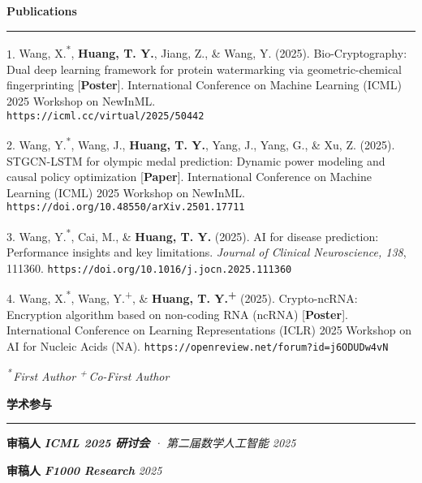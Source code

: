 \documentclass[UTF8, 10pt, fontset=adobe]{ctexart}
\renewenvironment{rSection}[1]{
\sectionskip
\textcolor{TsinghuaPurple}{\textbf{#1}}
\sectionlineskip
\hrule
\begin{list}{}{
\setlength{\leftmargin}{0em}
}
\item[]
}{
\end{list}
}
\begin{document}
\begin{rSection}{Publications}        

1. {Wang, X.\textsuperscript{*}, \textbf{Huang, T. Y.}, Jiang, Z., \& Wang, Y. (2025). Bio-Cryptography: Dual deep learning framework for protein watermarking via geometric-chemical fingerprinting [\textbf{Poster}]. International Conference on Machine Learning (ICML) 2025 Workshop on NewInML. \\\texttt{https://icml.cc/virtual/2025/50442}} 

2. {Wang, Y.\textsuperscript{*}, Wang, J., \textbf{Huang, T. Y.}, Yang, J., Yang, G., \& Xu, Z. (2025). STGCN-LSTM for olympic medal prediction: Dynamic power modeling and causal policy optimization [\textbf{Paper}]. International Conference on Machine Learning (ICML) 2025 Workshop on NewInML. \\
\texttt{https://doi.org/10.48550/arXiv.2501.17711}} 

3. {Wang, Y.\textsuperscript{*}, Cai, M., \& \textbf{Huang, T. Y.} (2025). AI for disease prediction: Performance insights and key limitations. \textit{Journal of Clinical Neuroscience, 138}, 111360. \texttt{https://doi.org/10.1016/j.jocn.2025.111360}} 

4. {Wang, X.\textsuperscript{*}, Wang, Y.\textsuperscript{+}, \& \textbf{Huang, T. Y.\textsuperscript{+}} (2025). Crypto-ncRNA: Encryption algorithm based on non-coding RNA (ncRNA) [\textbf{Poster}]. International Conference on Learning Representations (ICLR) 2025 Workshop on AI for Nucleic Acids (NA). \texttt{https://openreview.net/forum?id=j6ODUDw4vN}} 

\textit{\footnotesize \textsuperscript{*}\,First Author \quad \textsuperscript{+}\,Co-First Author}
\end{rSection}

\begin{rSection}{学术参与}\itemsep -3pt

{\textbf{审稿人}} \quad \textit{\textbf{ICML 2025 研讨会} · 第二届数学人工智能} \hfill \textit{2025}

{\textbf{审稿人}} \quad \textit{\textbf{F1000 Research}} \hfill \textit{2025}
\end{rSection}
\end{document}

